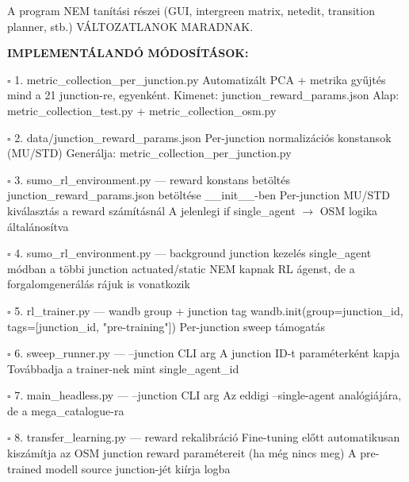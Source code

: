\documentclass[11pt,a4paper]{article}
\begin{document}
A program NEM tanítási részei (GUI, intergreen matrix, netedit,
transition planner, stb.) VÁLTOZATLANOK MARADNAK.

\textbf{IMPLEMENTÁLANDÓ MÓDOSÍTÁSOK:}

\par\noindent\hspace*{1em}$\square$ 1. metric\_collection\_per\_junction.py
Automatizált PCA + metrika gyűjtés mind a 21 junction-re,
egyenként. Kimenet: junction\_reward\_params.json
Alap: metric\_collection\_test.py + metric\_collection\_osm.py

\par\noindent\hspace*{1em}$\square$ 2. data/junction\_reward\_params.json
Per-junction normalizációs konstansok (MU/STD)
Generálja: metric\_collection\_per\_junction.py

\par\noindent\hspace*{1em}$\square$ 3. sumo\_rl\_environment.py — reward konstans betöltés
junction\_reward\_params.json betöltése \_\_init\_\_-ben
Per-junction MU/STD kiválasztás a reward számításnál
A jelenlegi if single\_agent $\rightarrow$ OSM logika általánosítva

\par\noindent\hspace*{1em}$\square$ 4. sumo\_rl\_environment.py — background junction kezelés
single\_agent módban a többi junction actuated/static
NEM kapnak RL ágenst, de a forgalomgenerálás rájuk is vonatkozik

\par\noindent\hspace*{1em}$\square$ 5. rl\_trainer.py — wandb group + junction tag
wandb.init(group=junction\_id, tags=[junction\_id, "pre-training"])
Per-junction sweep támogatás

\par\noindent\hspace*{1em}$\square$ 6. sweep\_runner.py — --junction CLI arg
A junction ID-t paraméterként kapja
Továbbadja a trainer-nek mint single\_agent\_id

\par\noindent\hspace*{1em}$\square$ 7. main\_headless.py — --junction CLI arg
Az eddigi --single-agent analógiájára, de a mega\_catalogue-ra

\par\noindent\hspace*{1em}$\square$ 8. transfer\_learning.py — reward rekalibráció
Fine-tuning előtt automatikusan kiszámítja az OSM junction
reward paramétereit (ha még nincs meg)
A pre-trained modell source junction-jét kiírja logba
\end{document}
